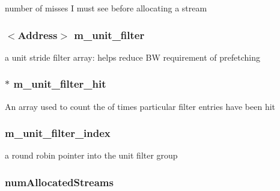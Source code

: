 number of misses I must see before allocating a stream \hypertarget{classPrefetcher_a22e41c52e5646478755d6c2a699f2a3e}{
\subsubsection[{m\_\-unit\_\-filter}]{$<${\bf Address}$>$ {\bf m\_\-unit\_\-filter}}}
\label{classPrefetcher_a22e41c52e5646478755d6c2a699f2a3e}
a unit stride filter array: helps reduce BW requirement of prefetching \hypertarget{classPrefetcher_adb0b4ed5c68fa291f0f0b1e5a08dd1e8}{
\subsubsection[{m\_\-unit\_\-filter\_\-hit}]{$\ast$ {\bf m\_\-unit\_\-filter\_\-hit}}}
\label{classPrefetcher_adb0b4ed5c68fa291f0f0b1e5a08dd1e8}
An array used to count the of times particular filter entries have been hit \hypertarget{classPrefetcher_aa7152e0ba18507f4499632ccffc8ddad}{
\subsubsection[{m\_\-unit\_\-filter\_\-index}]{ {\bf m\_\-unit\_\-filter\_\-index}}}
\label{classPrefetcher_aa7152e0ba18507f4499632ccffc8ddad}


a round robin pointer into the unit filter group \hypertarget{classPrefetcher_a9fa8a2d34e0af70cb6db907ad8df7470}{
\subsubsection[{numAllocatedStreams}]{ {\bf numAllocatedStreams}}}
\label{classPrefetcher_a9fa8a2d34e0af70cb6db907ad8df7470}


